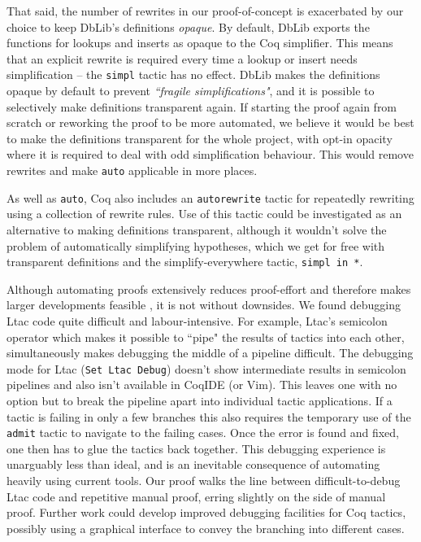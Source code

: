 \documentclass[]{unswthesis}
\let\c\texttt
\let\i\textit
\begin{document}
That said, the number of rewrites in our proof-of-concept is exacerbated by our choice to keep DbLib's definitions \i{opaque}. By default, DbLib exports the functions for lookups and inserts as opaque to the Coq simplifier. This means that an explicit rewrite is required every time a lookup or insert needs simplification -- the \c{simpl} tactic has no effect. DbLib makes the definitions opaque by default to prevent \i{``fragile simplifications"}, and it is possible to selectively make definitions transparent again. If starting the proof again from scratch or reworking the proof to be more automated, we believe it would be best to make the definitions transparent for the whole project, with opt-in opacity where it is required to deal with odd simplification behaviour. This would remove rewrites and make \c{auto} applicable in more places.

As well as \c{auto}, Coq also includes an \c{autorewrite} tactic for repeatedly rewriting using a collection of rewrite rules. Use of this tactic could be investigated as an alternative to making definitions transparent, although it wouldn't solve the problem of automatically simplifying hypotheses, which we get for free with transparent definitions and the simplify-everywhere tactic, \c{simpl in *}.

Although automating proofs extensively reduces proof-effort and therefore makes larger developments feasible \cite{cpdt}, it is not without downsides. We found debugging Ltac code quite difficult and labour-intensive. For example, Ltac's semicolon operator which makes it possible to ``pipe" the results of tactics into each other, simultaneously makes debugging the middle of a pipeline difficult. The debugging mode for Ltac (\c{Set Ltac Debug}) doesn't show intermediate results in semicolon pipelines and also isn't available in CoqIDE (or Vim). This leaves one with no option but to break the pipeline apart into individual tactic applications. If a tactic is failing in only a few branches this also requires the temporary use of the \c{admit} tactic to navigate to the failing cases. Once the error is found and fixed, one then has to glue the tactics back together. This debugging experience is unarguably less than ideal, and is an inevitable consequence of automating heavily using current tools. Our proof walks the line between difficult-to-debug Ltac code and repetitive manual proof, erring slightly on the side of manual proof. Further work could develop improved debugging facilities for Coq tactics, possibly using a graphical interface to convey the branching into different cases.
\end{document}
